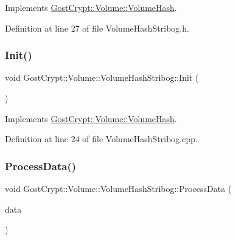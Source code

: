 Implements \hyperlink{class_gost_crypt_1_1_volume_1_1_volume_hash_a7f565609ef9bd178423575603b252d33}{Gost\+Crypt\+::\+Volume\+::\+Volume\+Hash}.



Definition at line 27 of file Volume\+Hash\+Stribog.\+h.

\mbox{\label{class_gost_crypt_1_1_volume_1_1_volume_hash_stribog_a0b2d7f2bbf5ee60590efdff1fef219a1}} 
\subsubsection{\texorpdfstring{Init()}{Init()}}
{\footnotesize\ttfamily void Gost\+Crypt\+::\+Volume\+::\+Volume\+Hash\+Stribog\+::\+Init (\begin{DoxyParamCaption}{ }\end{DoxyParamCaption})\hspace{0.3cm}{\ttfamily [virtual]}}



Implements \hyperlink{class_gost_crypt_1_1_volume_1_1_volume_hash_a7167d7316a705369d8bc4e1cc5f2e61e}{Gost\+Crypt\+::\+Volume\+::\+Volume\+Hash}.



Definition at line 24 of file Volume\+Hash\+Stribog.\+cpp.

\mbox{\label{class_gost_crypt_1_1_volume_1_1_volume_hash_stribog_ab3da67dc6f8ae8b092c089e5f174876e}} 
\subsubsection{\texorpdfstring{Process\+Data()}{ProcessData()}}
{\footnotesize\ttfamily void Gost\+Crypt\+::\+Volume\+::\+Volume\+Hash\+Stribog\+::\+Process\+Data (\begin{DoxyParamCaption}\item[{const \hyperlink{class_gost_crypt_1_1_buffer_ptr}{Buffer\+Ptr} \&}]{data }\end{DoxyParamCaption})\hspace{0.3cm}{\ttfamily [virtual]}}



